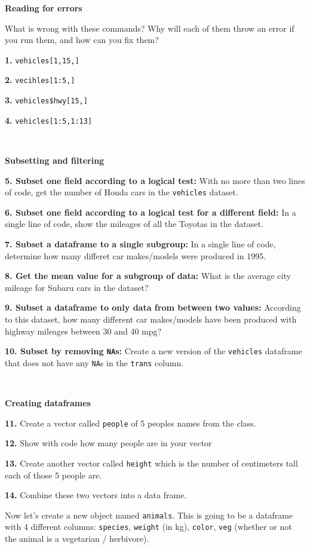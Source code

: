 \documentclass[
]{book}
\begin{document}
\textbf{Reading for errors}

What is wrong with these commands? Why will each of them throw an error if you run them, and how can you fix them?

\textbf{1.} \texttt{vehicles{[}1,15,{]}}

\textbf{2.} \texttt{vecihles{[}1:5,{]}}

\textbf{3.} \texttt{vehicles\$hwy{[}15,{]}}

\textbf{4.} \texttt{vehicles{[}1:5,1:13{]}}

~

\textbf{Subsetting and filtering}

\textbf{5. Subset one field according to a logical test:} With no more than two lines of code, get the number of Honda cars in the \texttt{vehicles} dataset.

\textbf{6. Subset one field according to a logical test for a different field:} In a single line of code, show the mileages of all the Toyotas in the dataset.

\textbf{7. Subset a dataframe to a single subgroup:} In a single line of code, determine how many differet car makes/models were produced in 1995.

\textbf{8. Get the mean value for a subgroup of data:} What is the average city mileage for Subaru cars in the dataset?

\textbf{9. Subset a dataframe to only data from between two values:} According to this dataset, how many different car makes/models have been produced with highway mileages between 30 and 40 mpg?

\textbf{10. Subset by removing \texttt{NA}s:} Create a new version of the \texttt{vehicles} dataframe that does not have any \texttt{NA}s in the \texttt{trans} column.

~

\textbf{Creating dataframes}

\textbf{11.} Create a vector called \texttt{people} of 5 peoples names from the class.

\textbf{12.} Show with code how many people are in your vector

\textbf{13.} Create another vector called \texttt{height} which is the number of centimeters tall each of those 5 people are.

\textbf{14.} Combine these two vectors into a data frame.

Now let's create a new object named \texttt{animals}. This is going to be a dataframe with 4 different columns: \texttt{species}, \texttt{weight} (in kg), \texttt{color}, \texttt{veg} (whether or not the animal is a vegetarian / herbivore).
\end{document}
